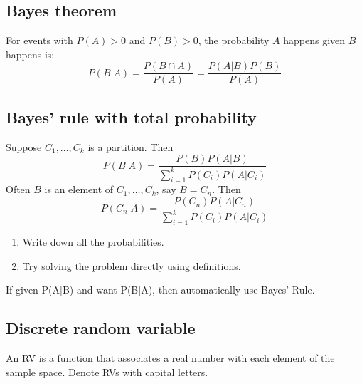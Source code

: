 \documentclass{article}
\begin{document}
\subsection{Bayes theorem}
    \begin{definition}
        For events with $P(A)>0$ and $P(B)>0$, the probability $A$ happens given $B$ happens is:
        \begin{equation}
            P(B|A) = \frac{P(B\cap A)}{P(A)} = \frac{P(A|B)P(B)}{P(A)}
        \end{equation}
    \end{definition}

\subsection{Bayes' rule with total probability}
    \begin{definition}
        Suppose $C_1,\ldots,C_k$ is a partition. Then 
        \begin{equation}
            P(B|A) = \frac{P(B)P(A|B)}{\sum_{i=1}^{k} P\left(C_i\right)P\left(A|C_i\right)}
        \end{equation}
        Often $B$ is an element of $C_1,\ldots,C_k$, say $B=C_n$. Then 
        \begin{equation}
            P\left(C_n|A\right) = \frac{P\left(C_n\right)P\left(A|C_n\right)}{\sum_{i=1}^{k} P\left(C_i\right)P\left(A|C_i\right)}
        \end{equation}
    \end{definition}

    \begin{process}
        \begin{enumerate}
            \item Write down all the probabilities. 
            \item Try solving the problem directly using definitions. 
        \end{enumerate}
    \end{process}

    \begin{intuition}
        If given P(A|B) and want P(B|A), then automatically use Bayes’ Rule. 
    \end{intuition}

\subsection{Discrete random variable}
    \begin{definition}
        An RV is a function that associates a real number with each element of the sample space. Denote RVs with capital letters.    
    \end{definition}
\end{document}
